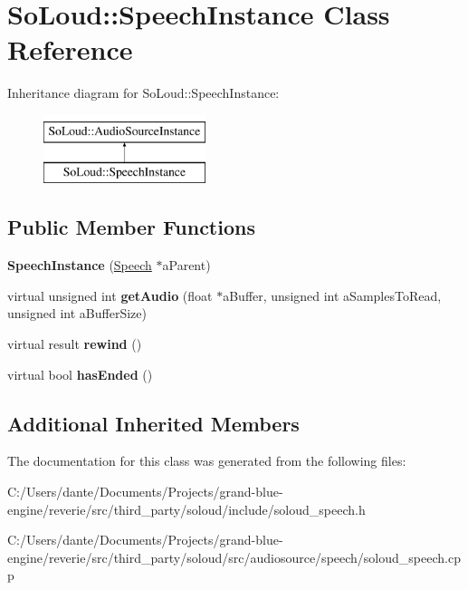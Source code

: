 \hypertarget{class_so_loud_1_1_speech_instance}{}\section{So\+Loud\+::Speech\+Instance Class Reference}
\label{class_so_loud_1_1_speech_instance}
Inheritance diagram for So\+Loud\+::Speech\+Instance\+:\begin{figure}[H]
\begin{center}
\leavevmode
\includegraphics[height=2.000000cm]{class_so_loud_1_1_speech_instance}
\end{center}
\end{figure}
\subsection*{Public Member Functions}
\begin{DoxyCompactItemize}
\item 
\mbox{\label{class_so_loud_1_1_speech_instance_a7fa645d0413fa76f3a7c6b4bd38e2602}} 
{\bfseries Speech\+Instance} (\mbox{\hyperlink{class_so_loud_1_1_speech}{Speech}} $\ast$a\+Parent)
\item 
\mbox{\label{class_so_loud_1_1_speech_instance_afb28853cb8dbc6a6613bca7f9247326d}} 
virtual unsigned int {\bfseries get\+Audio} (float $\ast$a\+Buffer, unsigned int a\+Samples\+To\+Read, unsigned int a\+Buffer\+Size)
\item 
\mbox{\label{class_so_loud_1_1_speech_instance_a3381ccaaa3ce2abd8a2d0914c440e89c}} 
virtual result {\bfseries rewind} ()
\item 
\mbox{\label{class_so_loud_1_1_speech_instance_a9af585d2c67bf0d89927f3c4f86ef160}} 
virtual bool {\bfseries has\+Ended} ()
\end{DoxyCompactItemize}
\subsection*{Additional Inherited Members}


The documentation for this class was generated from the following files\+:\begin{DoxyCompactItemize}
\item 
C\+:/\+Users/dante/\+Documents/\+Projects/grand-\/blue-\/engine/reverie/src/third\+\_\+party/soloud/include/soloud\+\_\+speech.\+h\item 
C\+:/\+Users/dante/\+Documents/\+Projects/grand-\/blue-\/engine/reverie/src/third\+\_\+party/soloud/src/audiosource/speech/soloud\+\_\+speech.\+cpp\end{DoxyCompactItemize}
